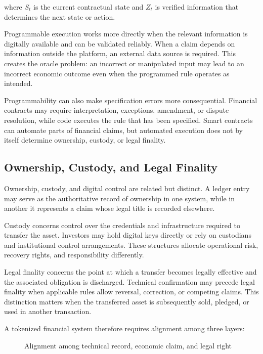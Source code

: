 where \(S_t\) is the current contractual state and \(Z_t\) is verified information that determines the next state or action.

Programmable execution works more directly when the relevant information is digitally available and can be validated reliably. When a claim depends on information outside the platform, an external data source is required. This creates the oracle problem: an incorrect or manipulated input may lead to an incorrect economic outcome even when the programmed rule operates as intended.

Programmability can also make specification errors more consequential. Financial contracts may require interpretation, exceptions, amendment, or dispute resolution, while code executes the rule that has been specified. 
Smart contracts can automate parts of financial claims, but automated execution does not by itself determine ownership, custody, or legal finality.


\subsection{Ownership, Custody, and Legal Finality}

Ownership, custody, and digital control are related but distinct. A ledger entry may serve as the authoritative record of ownership in one system, while in another it represents a claim whose legal title is recorded elsewhere.

Custody concerns control over the credentials and infrastructure required to transfer the asset. Investors may hold digital keys directly or rely on custodians and institutional control arrangements. These structures allocate operational risk, recovery rights, and responsibility differently.

Legal finality concerns the point at which a transfer becomes legally effective and the associated obligation is discharged. Technical confirmation may precede legal finality when applicable rules allow reversal, correction, or competing claims. This distinction matters when the transferred asset is subsequently sold, pledged, or used in another transaction.

A tokenized financial system therefore requires alignment among three layers:

\begin{figure}[H]
\centering
{}
\caption{Alignment among technical record, economic claim, and legal right}
\label{fig:ch24-layer-alignment}
\end{figure}

